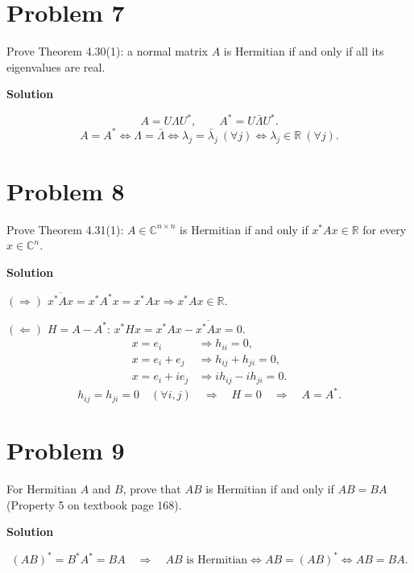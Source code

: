 \documentclass[UTF8,10pt,letterpaper,fontset=fandol]{ctexart}
\newcommand{\C}{\mathbb C}
\newcommand{\R}{\mathbb R}
\begin{document}
\section{Problem 7}
Prove Theorem 4.30(1): a normal matrix $A$ is Hermitian if and only if all its eigenvalues are real.
\par{}\textbf{Solution}\par

\[
 A=U\Lambda U^*,\qquad A^*=U\bar\Lambda U^*.
\]
\[
 \boxed{A=A^*\iff\Lambda=\bar\Lambda
 \iff\lambda_j=\bar\lambda_j\ (\forall j)\iff\lambda_j\in\R\ (\forall j)}.
\]
\section{Problem 8}
Prove Theorem 4.31(1): $A\in\C^{n\times n}$ is Hermitian if and only if $x^*Ax\in\R$ for every $x\in\C^n$.
\par{}\textbf{Solution}\par

\textbf{$(\Rightarrow)$}\quad
 $\overline{x^*Ax}=x^*A^*x=x^*Ax\Longrightarrow x^*Ax\in\R$.

\textbf{$(\Leftarrow)$}\quad
 $H=A-A^*$:\quad
 $x^*Hx=x^*Ax-\overline{x^*Ax}=0$.
\begin{align*}
 x=e_i&\Longrightarrow h_{ii}=0,\\
 x=e_i+e_j&\Longrightarrow h_{ij}+h_{ji}=0,\\
 x=e_i+ie_j&\Longrightarrow ih_{ij}-ih_{ji}=0.
\end{align*}
\[
 h_{ij}=h_{ji}=0\quad(\forall i,j)\quad\Longrightarrow\quad H=0
 \quad\Longrightarrow\quad\boxed{A=A^*}.
\]
\section{Problem 9}
For Hermitian $A$ and $B$, prove that $AB$ is Hermitian if and only if $AB=BA$ (Property 5 on textbook page 168).
\par{}\textbf{Solution}\par

\[
 (AB)^*=B^*A^*=BA
 \quad\Longrightarrow\quad
 \boxed{AB\text{ is Hermitian}\iff AB=(AB)^*\iff AB=BA}.
\]
\end{document}
